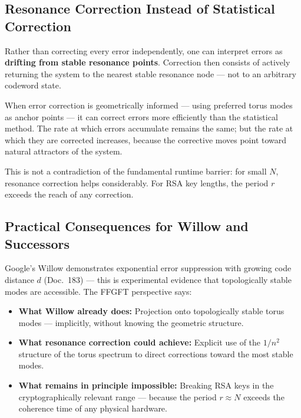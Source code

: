\subsection{Resonance Correction Instead of Statistical Correction}

Rather than correcting every error independently, one can interpret errors as
\textbf{drifting from stable resonance points}. Correction then consists of actively
returning the system to the nearest stable resonance node — not to an arbitrary
codeword state.

\begin{keyresult}
When error correction is geometrically informed — using preferred torus modes as
anchor points — it can correct errors more efficiently than the statistical method.
The rate at which errors accumulate remains the same; but the rate at which they
are corrected increases, because the corrective moves point toward natural attractors
of the system.

This is not a contradiction of the fundamental runtime barrier: for small $N$,
resonance correction helps considerably. For RSA key lengths, the period $r$ exceeds
the reach of any correction.
\end{keyresult}

\subsection{Practical Consequences for Willow and Successors}

Google's Willow demonstrates exponential error suppression with growing code distance
$d$ (Doc.~183) — this is experimental evidence that topologically stable modes are
accessible. The FFGFT perspective says:

\begin{itemize}
    \item \textbf{What Willow already does:} Projection onto topologically stable
    torus modes — implicitly, without knowing the geometric structure.
    \item \textbf{What resonance correction could achieve:} Explicit use of the
    $1/n^2$ structure of the torus spectrum to direct corrections toward the most
    stable modes.
    \item \textbf{What remains in principle impossible:} Breaking RSA keys in the
    cryptographically relevant range — because the period $r \approx N$ exceeds the
    coherence time of any physical hardware.
\end{itemize}


